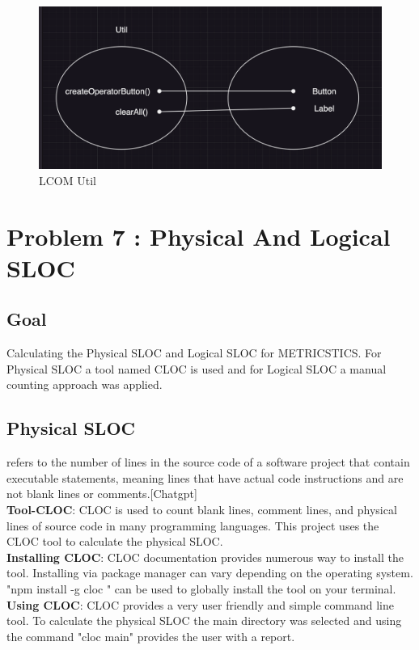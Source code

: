 \documentclass[12pt,letterpaper]{report}
\begin{document}
\begin{figure}
    \begin{center}
    \includegraphics[width=0.5\linewidth]{LCOM5.png}
    \end{center}
       \caption{LCOM Util \label{Code Sample}}
\end{figure}



\chapter{Problem 7 : Physical And Logical SLOC}

\section{Goal}

Calculating the Physical SLOC and Logical SLOC for METRICSTICS. For Physical SLOC a tool named CLOC is used and for Logical SLOC a manual counting approach was applied.\\

\section{Physical SLOC}
refers to the number of lines in the source code of a software project that contain executable statements, meaning lines that have actual code instructions and are not blank lines or comments.[Chatgpt]
\\

\textbf{Tool-CLOC}: CLOC is used to count blank lines, comment lines, and physical lines of source code in many programming languages. This project uses the CLOC tool to calculate the physical SLOC.\\

\textbf{Installing CLOC}: CLOC documentation provides numerous way to install the tool. Installing via package manager can vary depending on the operating system.
"npm install -g cloc " can be used to globally install the tool on your terminal.\\

\textbf{Using CLOC}: CLOC provides a very user friendly and simple command line tool. To calculate the physical SLOC the main directory was selected and using the command "cloc main" provides the user with a report.  \\
\end{document}
